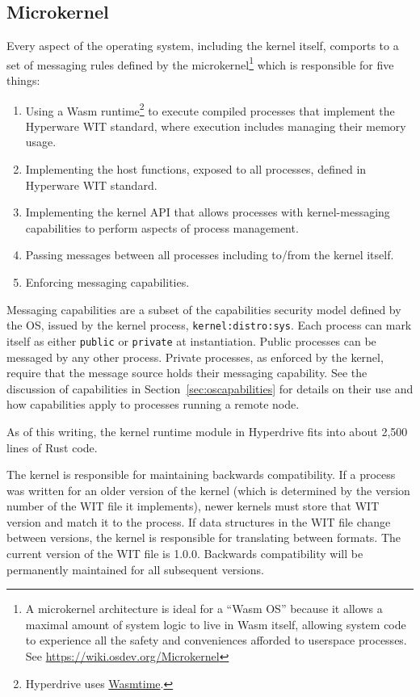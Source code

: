 \documentclass[runningheads]{llncs}
\begin{document}
\subsection{Microkernel}
\label{sec:osmicrokernel}

Every aspect of the operating system, including the kernel itself, comports to a set of messaging rules defined by the microkernel\footnote{A microkernel architecture is ideal for a ``Wasm OS'' because it allows a maximal amount of system logic to live in Wasm itself, allowing system code to experience all the safety and conveniences afforded to userspace processes. See \url{https://wiki.osdev.org/Microkernel}} which is responsible for five things:
\begin{enumerate}
    \item Using a Wasm runtime\footnote{Hyperdrive uses \href{https://wasmtime.dev}{Wasmtime}.}
    to execute compiled processes that implement the Hyperware WIT standard, where execution includes managing their memory usage.
    \item Implementing the host functions, exposed to all processes, defined in Hyperware WIT standard.
    \item Implementing the kernel API that allows processes with kernel-messaging capabilities to perform aspects of process management.
    \item Passing messages between all processes including to/from the kernel itself.
    \item Enforcing messaging capabilities.
\end{enumerate}

Messaging capabilities are a subset of the capabilities security model defined by the OS, issued by the kernel process, \verb|kernel:distro:sys|.
Each process can mark itself as either \verb|public| or \verb|private| at instantiation.
Public processes can be messaged by any other process.
Private processes, as enforced by the kernel, require that the message source holds their messaging capability.
See the discussion of capabilities in Section~\ref{sec:oscapabilities} for details on their use and how capabilities apply to processes running a remote node.

As of this writing, the kernel runtime module in Hyperdrive fits into about 2,500 lines of Rust code.

The kernel is responsible for maintaining backwards compatibility.
If a process was written for an older version of the kernel (which is determined by the version number of the WIT file it implements), newer kernels must store that WIT version and match it to the process.
If data structures in the WIT file change between versions, the kernel is responsible for translating between formats.
The current version of the WIT file is 1.0.0.
Backwards compatibility will be permanently maintained for all subsequent versions.
\end{document}
